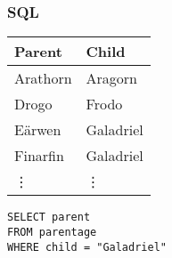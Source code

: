 \documentclass[xcolor=table]{beamer}
\begin{document}



\begin{frame}
  \frametitle{SQL}


  \begin{minipage}{0.4\textwidth}
    \centering
    \begin{tabular}{l|l}
      \textbf{Parent} & \textbf{Child}\\\hline
      Arathorn & Aragorn\\
      Drogo & Frodo\\
      E\"arwen & Galadriel\\
      Finarfin & Galadriel\\
      \rowcolor{white}
      \hfill\vdots & \hfill\vdots
    \end{tabular}
  \end{minipage}
  \hfill
  \begin{minipage}{0.5\textwidth}
    \texttt{SELECT parent\\FROM parentage\\WHERE child = "Galadriel"}
  \end{minipage}
\end{frame}
\end{document}
